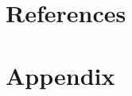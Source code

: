 \documentclass[12pt]{article}
\begin{document}
  



 
\clearpage


\section*{References}
\renewcommand*{\refname}{\vspace*{-12mm}} 




\section*{Appendix}



\clearpage
 
 
 
 
 

 
\end{document}
